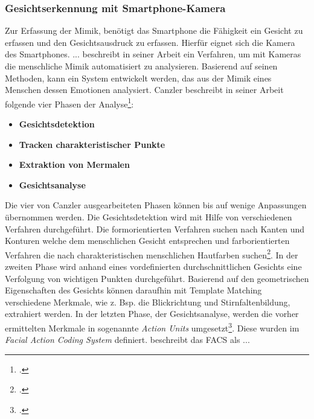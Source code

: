 \subsubsection{Gesichtserkennung mit Smartphone-Kamera}
Zur Erfassung der Mimik, benötigt das Smartphone die Fähigkeit ein Gesicht zu erfassen und den Gesichtsausdruck zu erfassen. Hierfür eignet sich  die Kamera des Smartphones. ... \newline %
\cite{Can01} beschreibt in seiner Arbeit ein Verfahren, um mit Kameras die menschliche Mimik automatisiert zu analysieren. Basierend auf seinen Methoden, kann ein System entwickelt werden, das aus der Mimik eines Menschen dessen Emotionen analysiert. Canzler beschreibt in seiner Arbeit folgende vier Phasen der Analyse\footcite[Vgl. ][S.2-5]{Can01}:
\begin{itemize}
	\item[1.] \textbf{Gesichtsdetektion}
	\item[2.] \textbf{Tracken charakteristischer Punkte}
	\item[3.] \textbf{Extraktion von Mermalen}%
	\item[4.] \textbf{Gesichtsanalyse}
\end{itemize}
Die vier von Canzler ausgearbeiteten Phasen können bis auf wenige Anpassungen übernommen werden. Die Gesichtsdetektion wird mit Hilfe von verschiedenen Verfahren durchgeführt. Die formorientierten Verfahren suchen nach Kanten und Konturen welche dem menschlichen Gesicht entsprechen und farborientierten Verfahren die nach charakteristischen menschlichen Hautfarben suchen\footcite[Vgl. ][S.2 Z.14ff]{Can01}. In der zweiten Phase wird anhand eines vordefinierten durchschnittlichen Gesichts eine Verfolgung von wichtigen Punkten durchgeführt. %
Basierend auf den geometrischen Eigenschaften des Gesichts können daraufhin mit Template Matching verschiedene Merkmale, wie z. Bsp. die Blickrichtung und Stirnfaltenbildung, extrahiert werden. In der letzten Phase, der Gesichtsanalyse, werden die vorher ermittelten Merkmale in sogenannte \textit{Action Units} umgesetzt\footcite[Vgl. ][S.4 Z.17-21]{Can01}. Diese wurden im \textit{Facial Action Coding System} definiert. \cite{Kai98} beschreibt das FACS als ...
% 
